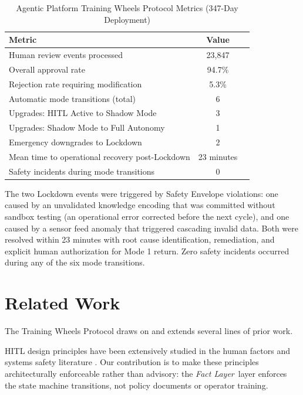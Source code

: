 \documentclass[12pt]{article}
\newcommand{\fact}{\textit{Fact Layer}}
\begin{document}
\begin{center}
\begin{table}[htbp]
\caption{Agentic Platform Training Wheels Protocol Metrics (347-Day Deployment)}
\label{tab:twp-metrics}
\begin{tabular}{lcc}
\toprule
\textbf{Metric} & \textbf{Value} \\
\midrule
Human review events processed & 23,847 \\
Overall approval rate & 94.7\% \\
Rejection rate requiring modification & 5.3\% \\
Automatic mode transitions (total) & 6 \\
Upgrades: HITL Active to Shadow Mode & 3 \\
Upgrades: Shadow Mode to Full Autonomy & 1 \\
Emergency downgrades to Lockdown & 2 \\
Mean time to operational recovery post-Lockdown & 23 minutes \\
Safety incidents during mode transitions & 0 \\
\bottomrule
\end{tabular}
\end{table}
\end{center}

The two Lockdown events were triggered by Safety Envelope violations: one caused by an unvalidated knowledge encoding that was committed without sandbox testing (an operational error corrected before the next cycle), and one caused by a sensor feed anomaly that triggered cascading invalid data. Both were resolved within 23 minutes with root cause identification, remediation, and explicit human authorization for Mode 1 return. Zero safety incidents occurred during any of the six mode transitions.

\section{Related Work}
\label{sec:related}

The Training Wheels Protocol draws on and extends several lines of prior work.

HITL design principles have been extensively studied in the human factors and systems safety literature \cite{bainbridge1983}. Our contribution is to make these principles architecturally enforceable rather than advisory: the \fact\ layer enforces the state machine transitions, not policy documents or operator training.
\end{document}

